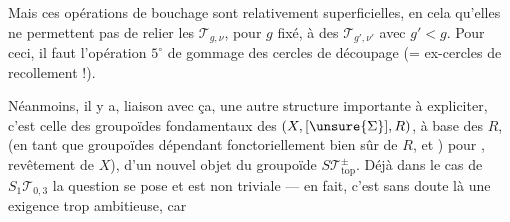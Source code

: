 Mais ces opérations de bouchage sont relativement superficielles, en cela qu'elles ne permettent pas de relier les $\mathcal T_{g,\nu}$, pour $g$ fixé, à des $\mathcal T_{g',\nu'}$ avec $g'<g$. Pour ceci, il faut l'opération \textcircled{$5^\circ$} de gommage des cercles de découpage (= ex-cercles de recollement !).

Néanmoins, il y a,   liaison avec ça, une autre structure importante à expliciter, c'est celle  des groupoïdes fondamentaux  des $(X,[\unsure{\Sigma}],R)$,  à base des $R$, (en tant que groupoïdes dépendant fonctoriellement bien sûr de $R$, et   ) pour    ,   revêtement  de $X$), d'un nouvel objet du  groupoïde $S\mathcal T_{\mathrm{top}}^\pm$. Déjà dans le cas de $S_1\mathcal T_{0,3}$ la question se pose et est non triviale --- en fait, c'est sans doute là une exigence trop ambitieuse, car


